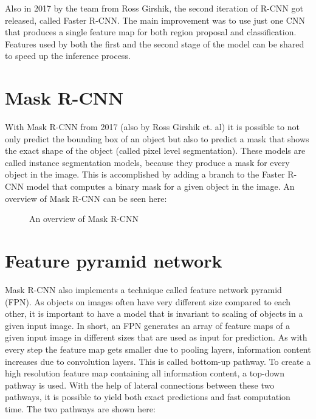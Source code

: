 Also in 2017 by the team from Ross Girshik, the second iteration of R-CNN got released, called Faster R-CNN. The main improvement was to use just one CNN that produces a single feature map for both region proposal and classification. Features used by both the first and the second stage of the model can be shared to speed up the inference process.

\section{Mask R-CNN}

With Mask R-CNN from 2017 (also by Ross Girshik et. al) it is possible to not only predict the bounding box of an object but also to predict a mask that shows the exact shape of the object (called pixel level segmentation). These models are called instance segmentation models, because they produce a mask for every object in the image. This is accomplished by adding a branch to the Faster R-CNN model that computes a binary mask for a given object in the image. An overview of Mask R-CNN can be seen here:

\begin{figure}[H]
	\caption{\label{fig:maskrcnn2} An overview of Mask R-CNN}
\end{figure}

\section{Feature pyramid network}
\label{fpn}

Mask R-CNN also implements a technique called feature network pyramid (FPN). As objects on images often have very different size compared to each other, it is important to have a model that is invariant to scaling of objects in a given input image. In short, an FPN generates an array of feature maps of a given input image in different sizes that are used as input for prediction. As with every step the feature map gets smaller due to pooling layers, information content increases due to convolution layers. This is called bottom-up pathway. To create a high resolution feature map containing all information content, a top-down pathway is used. With the help of lateral connections between these two pathways, it is possible to yield both exact predictions and fast computation time. The two pathways are shown here:

